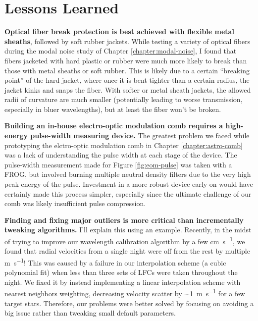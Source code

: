 \section{Lessons Learned} \label{conclusion:lessons}

\textbf{Optical fiber break protection is best achieved with flexible metal sheaths}, followed by soft rubber jackets. While testing a variety of optical fibers during the modal noise study of Chapter \ref{chapter:modal-noise}, I found that fibers jacketed with hard plastic or rubber were much more likely to break than those with metal sheaths or soft rubber. This is likely due to a certain ``breaking point'' of the hard jacket, where once it is bent tighter than a certain radius, the jacket kinks and snaps the fiber. With softer or metal sheath jackets, the allowed radii of curvature are much smaller (potentially leading to worse transmission, especially in bluer wavelengths), but at least the fiber won't be broken.

\textbf{Building an in-house electro-optic modulation comb requires a high-energy pulse-width measuring device.} The greatest problem we faced while prototyping the elctro-optic modulation comb in Chapter \ref{chapter:astro-comb} was a lack of understanding the pulse width at each stage of the device. The pulse-width measurement made for Figure \ref{fig:eom-pulse} was taken with a FROG, but involved burning multiple neutral density filters due to the very high peak energy of the pulse. Investment in a more robust device early on would have certainly made this process simpler, especially since the ultimate challenge of our comb was likely insufficient pulse compression.

\textbf{Finding and fixing major outliers is more critical than incrementally tweaking algorithms.} I'll explain this using an example. Recently, in the midst of trying to improve our wavelength calibration algorithm by a few \si{\centi\meter\per\second}, we found that radial velocities from a single night were off from the rest by multiple \si{\meter\per\second}! This was caused by a failure in our interpolation scheme (a cubic polynomial fit) when less than three sets of LFCs were taken throughout the night. We fixed it by instead implementing a linear interpolation scheme with nearest neighbors weighting, decreasing velocity scatter by $\sim$1~\si{\meter\per\second} for a few target stars. Therefore, our problems were better solved by focusing on avoiding a big issue rather than tweaking small default parameters.

